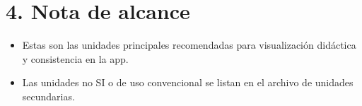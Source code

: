 \documentclass[11pt,a4paper]{article}
\begin{document}
\section*{4. Nota de alcance}

\begin{itemize}
  \item Estas son las unidades principales recomendadas para visualización didáctica y consistencia en la app.
  \item Las unidades no SI o de uso convencional se listan en el archivo de unidades secundarias.
\end{itemize}
\end{document}
